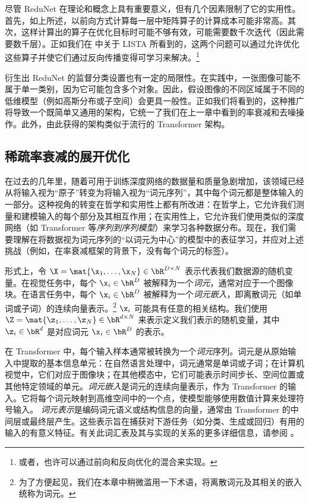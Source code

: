 \documentclass[../../book-main_zh.tex]{subfiles}
\begin{document}
尽管 ReduNet 在理论和概念上具有重要意义，但有几个因素限制了它的实用性。首先，如上所述，以前向方式计算每一层中矩阵算子的计算成本可能非常高。其次，这样计算出的算子在优化目标时可能不够有效，可能需要数千次迭代（因此需要数千层）。正如我们在  中关于 LISTA 所看到的，这两个问题可以通过允许优化这些算子并使它们通过反向传播变得可学习来解决。\footnote{或者，也许可以通过前向和反向优化的混合来实现。}

衍生出 ReduNet 的监督分类设置也有一定的局限性。在实践中，一张图像可能不属于单一类别，因为它可能包含多个对象。因此，假设图像的不同区域属于不同的低维模型（例如高斯分布或子空间）会更具一般性。正如我们将看到的，这种推广将导致一个既简单又通用的架构，它统一了我们在上一章中看到的率衰减和去噪操作。此外，由此获得的架构类似于流行的 Transformer 架构。

\subsection{稀疏率衰减的展开优化}

在过去的几年里，随着可用于训练深度网络的数据量和质量急剧增加，该领域已经从将输入视为“原子”转变为将输入视为“词元序列”，其中每个词元都是整体输入的一部分。这种视角的转变在哲学和实用性上都有所改进：在哲学上，它允许我们测量和建模输入的每个部分及其相互作用；在实用性上，它允许我们使用类似的深度网络（如 Transformer 等\textit{序列到序列模型}）来学习各种数据分布。现在，我们需要理解在将数据视为词元序列的“以词元为中心”的模型中的表征学习，并应对上述挑战（例如，在率衰减框架的背景下，没有每个词元的标签）。

形式上，令 \(\X = \mat{\x_{1}, \dots, \x_{N}} \in \bR^{D \times N}\) 表示代表我们数据源的随机变量。在视觉任务中，每个 \(\x_{i} \in \bR^{D}\) 被解释为一个\textit{词元}，通常对应于一个图像块。在语言任务中，每个 \(\x_{i} \in \bR^{D}\) 被解释为一个\textit{词元嵌入}，即离散词元（如单词或子词）的连续向量表示。\footnote{为了方便起见，我们在本章中稍微滥用一下术语，将离散词元及其相关的嵌入统称为词元。}  %
\(\x_{i}\) 可能具有任意的相关结构。我们使用 \(\Z = \mat{\z_{1}, \dots, \z_{N}} \in \bR^{d \times N}\) 来表示定义我们表示的随机变量，其中 \(\z_{i} \in \bR^{d}\) 是对应词元 \(\x_i \in \bR^{D}\) 的表示。%

\begin{remark}
    在 Transformer 中，每个输入样本通常被转换为一个{\em 词元}序列。词元是从原始输入中提取的基本信息单元：在自然语言处理中，词元通常是单词或子词；在计算机视觉中，它们对应于图像块；在其他模态中，它们可能表示时间步长、空间位置或其他特定领域的单元。{\em 词元嵌入}是词元的连续向量表示，作为 Transformer 的输入。它将每个词元映射到高维空间中的一个点，使模型能够使用数值计算来处理符号输入。
    {\em 词元表示}是编码词元语义或结构信息的向量，通常由 Transformer 的中间层或最终层产生。这些表示旨在捕获对下游任务（如分类、生成或回归）有用的输入的有意义特征。有关此词汇表及其与实现的关系的更多详细信息，请参阅 。
\end{remark}
\end{document}

